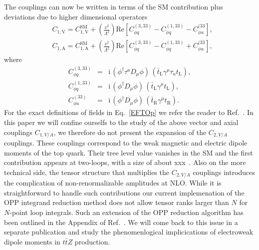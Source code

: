 \documentclass[preprint]{JHEP3} %
\def\ttbZ{t\bar{t}Z}
\def\ConeA{C_{1,\mathrm{A}}}
\def\ConeV{C_{1,\mathrm{V}}}
\def\CtwoA{C_{2,\mathrm{A}}}
\def\CtwoV{C_{2,\mathrm{V}}}
\newcommand{\be}{\begin{eqnarray}}
\newcommand{\ee}{\end{eqnarray}}
\begin{document}
The couplings can now be written in terms of the SM contribution plus deviations due to higher dimensional operators
\be
\label{Cone_NP}
   &\ConeV=\ConeV^\mathrm{SM}+\left(\frac{v^2}{\Lambda^2} \right) \mathrm{Re} \left[ C^{(3,33)}_{\phi q} - C^{(1,33)}_{\phi q} - C^{(33}_{\phi u}   \right],
   \\
   &\ConeA=\ConeA^\mathrm{SM}+\left(\frac{v^2}{\Lambda^2} \right) \mathrm{Re}\left[  C^{(3,33)}_{\phi q} - C^{(1,33)}_{\phi q} + C^{(33}_{\phi u}  \right],
   \nonumber
\ee
where 
\be  
  \label{EFTOp}
  C^{(3,33)}_{\phi q} &=& \mathrm{i} \, (\phi^\dagger \tau^a D_\mu \phi) \, (\bar{t}_\mathrm{L} \gamma^\mu \tau_a t_\mathrm{L})  ,
  \nonumber \\
  C^{(1,33)}_{\phi q} &=& \mathrm{i} \, (\phi^\dagger D_\mu \phi) \, (\bar{t}_\mathrm{L} \gamma^\mu t_\mathrm{L})  ,
  \\
  C^{(33)}_{\phi u} &=& \mathrm{i} \, (\phi^\dagger D_\mu \phi) \, (\bar{t}_\mathrm{R} \gamma^\mu t_\mathrm{R}). 
  \nonumber
\ee
For the exact definitions of fields in Eq.~\ref{EFTOp} we refer the reader to Ref.~\cite{0811.3842}.
In this paper we will confine ourselfs to the study of the above vector and axial couplings $C_{1,V/A}$, we therefore do not present the expansion of the $C_{2,V/A}$ couplings. 
These couplings correspond to the weak magnetic and electric dipole moments of the top quark. 
Their tree level value vanishes in the SM and the first contribution appears at two-loops, with a size of about xxx~\cite{xx}.
Also on the more technical side, the tensor structure that multiplies the $C_{2,V/A}$ couplings introduces the complication of 
non-renormalizable amplitudes at NLO.
While it is straightforward to handle such contributions our current implemenation of the OPP integrand reduction method 
does not allow tensor ranks larger than $N$ for $N$-point loop integrals.
Such an extension of the OPP reduction algorithm has been outlined in the Appendix of Ref.~\cite{}. 
We will come back to this issue in a separate publication and study the phenomenlogical implicications of electroweak dipole moments in $\ttbZ$ production.
\end{document}
